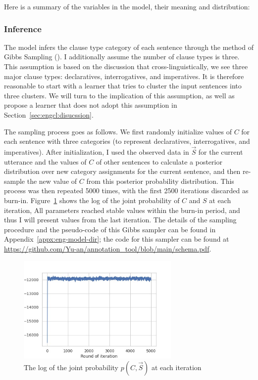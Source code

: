 Here is a summary of the variables in the model, their meaning and distribution:






\subsubsection{Inference}
\label{sec:engcl:model:baseline:infer}

The model infers the clause type category of each sentence through the method of Gibbs Sampling (\cite{geman1984gibbs}). I additionally assume the number of clause types is three. This assumption is based on the discussion that cross-linguistically, we see three major clause types: declaratives, interrogatives, and imperatives. It is therefore reasonable to start with a learner that tries to cluster the input sentences into three clusters. We will turn to the implication of this assumption, as well as propose a learner that does not adopt this assumption in Section~\ref{sec:engcl:disucssion}. 

The sampling process goes as follows. We first randomly initialize values of $C$ for each sentence with three categories (to represent declaratives, interrogatives, and imperatives). After initialization, I used the observed data in $\vec{S}$ for the current utterance and the values of $C$ of other sentences to calculate a posterior distribution over new category assignments for the current sentence, and then re-sample the new value of $C$ from this posterior probability distribution. This process was then repeated 5000 times, with the first 2500 iterations discarded as burn-in. Figure~\ref{fig:baseline-iter} shows the log of the joint probability of $C$ and $S$ at each iteration,  All parameters reached stable values within the burn-in period, and thus I will present values from the last iteration. The details of the sampling procedure and the pseudo-code of this Gibbs sampler can be found in Appendix~\ref{appx:eng-model-dir}; the code for this sampler can be found at \url{https://github.com/Yu-an/annotation_tool/blob/main/schema.pdf}. 

\begin{figure}[H]
    \centering
    \includegraphics[width=0.7\textwidth]{figures/baseline-iter.jpg}
    \caption{The log of the joint probability $p(C,\vec{S})$ at each iteration}
    \label{fig:baseline-iter}
\end{figure}


